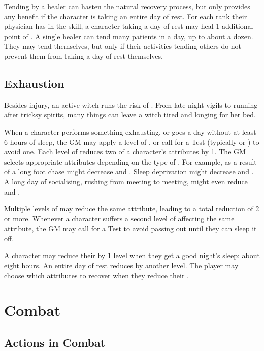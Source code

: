 Tending by a healer can hasten the natural recovery process, but only provides any benefit if the character is taking an entire day of rest.
For each rank their physician has in the  skill, a character taking a day of rest may heal 1 additional point of {\damage}.
A single healer can tend many patients in a day, up to about a dozen.
They may tend themselves, but only if their activities tending others do not prevent them from taking a day of rest themselves.

\subsection{Exhaustion}

Besides injury, an active witch runs the risk of {\exhaustion}.
From late night vigils to running after tricksy spirits, many things can leave a witch tired and longing for her bed.

When a character performs something exhausting, or goes a day without at least 6 hours of sleep, the GM may apply a level of {\exhaustion}, or call for a Test (typically  or ) to avoid one.
Each level of {\exhaustion} reduces two of a character's attributes by 1.
The GM selects appropriate attributes depending on the type of {\exhaustion}.
For example, {\exhaustion} as a result of a long foot chase might decrease  and .
Sleep deprivation might decrease  and .
A long day of socialising, rushing from meeting to meeting, might even reduce  and .

Multiple levels of {\exhaustion} may reduce the same attribute, leading to a total reduction of 2 or more.
Whenever a character suffers a second level of {\exhaustion} affecting the same attribute, the GM may call for a Test to avoid passing out until they can sleep it off.

A character may reduce their {\exhaustion} by 1 level when they get a good night's sleep: about eight hours.
An entire day of rest reduces {\exhaustion} by another level.
The player may choose which attributes to recover when they reduce their {\exhaustion}.

\section{Combat}

\subsection{Actions in Combat}

